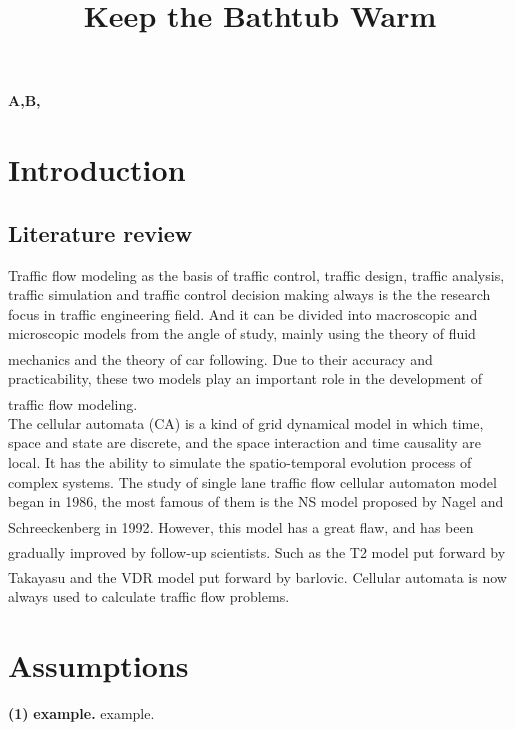 \documentclass{mcmthesis}
\title{}
\date{}
\newcommand{\upcite}[1]{\textsuperscript{\textsuperscript{\cite{#1}}}}
\begin{document}
\begin{abstract}%


\title{Keep the Bathtub Warm}



\end{abstract}

\begin{keywords}
	\textbf{A,\indent B, \indent}
\end{keywords}
\maketitle
\tableofcontents\thispagestyle{empty}
\newpage

\setcounter{page}{1}
\section{Introduction}
\subsection{Literature review}
\indent Traffic flow modeling as the basis of traffic control, traffic design, traffic analysis, traffic simulation and traffic control decision making always is the the research focus in traffic engineering field. And it can be divided into macroscopic and microscopic models from the angle of study, mainly using the theory of fluid mechanics and the theory of car following\upcite{TF1}. Due to their accuracy and practicability, these two models play an important role in the development of traffic flow modeling\upcite{TF2}.\\
\indent The cellular automata (CA) is a kind of grid dynamical model in which time, space and state are discrete, and the space interaction and time causality are local. It has the ability to simulate the spatio-temporal evolution process of complex systems. The study of single lane traffic flow cellular automaton model began in 1986, the most famous of them is the NS model proposed by Nagel and Schreeckenberg in 1992\upcite{ca1}. However, this model has a great flaw, and has been gradually improved by follow-up scientists. Such as the T2 model\upcite{ca2} put forward by Takayasu and the VDR model\upcite{ca3} put forward by barlovic. Cellular automata is now always used to calculate traffic flow problems.\\


\section{Assumptions}
\noindent
{\bf (1) } \textbf{example.} example.\\
\end{document}
